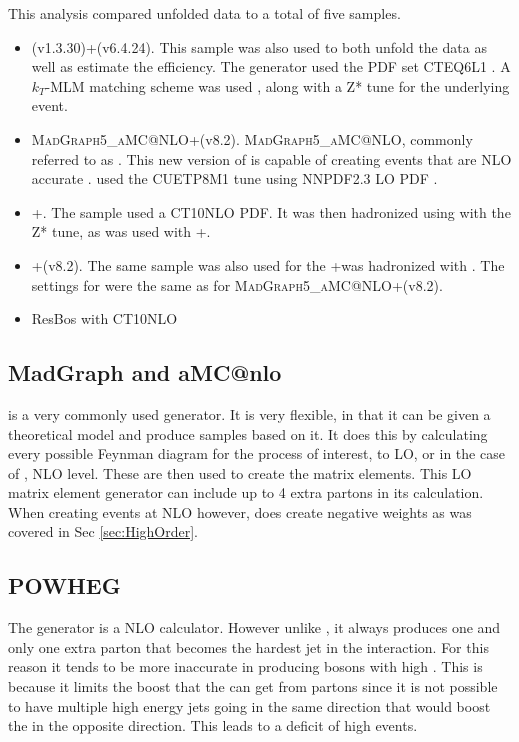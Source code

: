 This analysis compared unfolded data to a total of five samples. 
\begin{itemize}
    \item \MADGRAPH(v1.3.30)\cite{Alwall:2011uj}+\PYTHIAsix(v6.4.24)\cite{Sjostrand:2006za}. This sample was also used to both unfold the data as well as estimate the efficiency. The \MADGRAPH generator used the PDF set CTEQ6L1 \cite{Pumplin:2002vw}.  A $k_T$-MLM matching scheme was used \cite{Alwall:2007fs}, along with a Z* tune \cite{Chatrchyan:2013gfi, Khachatryan:2015pea} for the underlying event.
    \item \textsc{MadGraph5\_aMC@NLO}+\PYTHIAeight(v8.2).  \textsc{MadGraph5\_aMC@NLO}, commonly referred to as \AMCatNLO. This new version of \MADGRAPH is capable of creating events that are NLO accurate \cite{Alwall:2014hca}. \PYTHIAeight used the CUETP8M1 tune \cite{Khachatryan:2015pea} using NNPDF2.3 LO PDF \cite{Ball:2010de,Ball:2011mu}. 
    \item \POWHEG+\PYTHIAsix. The \POWHEG sample\cite{Nason:2004rx, Alioli:2010xd, Alioli:2010qp, Frixione:2007vw} used a CT10NLO PDF\cite{Gao:2013xoa}. It  was then  hadronized using \PYTHIAsix with the Z* tune, as was used with \MADGRAPH+\PYTHIAsix.
    \item \POWHEG+\PYTHIAeight(v8.2). The same \POWHEG sample was also used for the \POWHEG+\PYTHIAsix was hadronized with \PYTHIAeight. The settings for \PYTHIAeight were the same as for \textsc{MadGraph5\_aMC@NLO}+\PYTHIAeight(v8.2).
    \item ResBos \cite{Ladinsky:1993zn,Balazs:1997xd,Landry:2002ix} with CT10NLO
\end{itemize}

\subsection{MadGraph and aMC@nlo}

\MADGRAPH is a very commonly used  generator. It is very flexible, in that it can be given a theoretical model and produce samples based on it. It does this by calculating every possible Feynman diagram for the process of interest, to LO, or in the case of \AMCatNLO, NLO level. These are then used to create the matrix elements. This LO matrix element generator can include up to 4 extra partons in its calculation.  When creating events at NLO however, \AMCatNLO does create negative weights as was covered in Sec \ref{sec:HighOrder}.
\subsection{POWHEG}
The \POWHEG generator is a NLO calculator. However unlike \MADGRAPH, it always produces one and only one extra parton that becomes the hardest jet in the interaction. For this reason it tends to be more inaccurate in producing \Z bosons with high \pt. This is because it limits the boost that the \Z can get from partons since it is not possible to have multiple high energy jets going in the same direction that would boost the \Z in the opposite direction. This leads to a deficit of high \pt \Z events.
